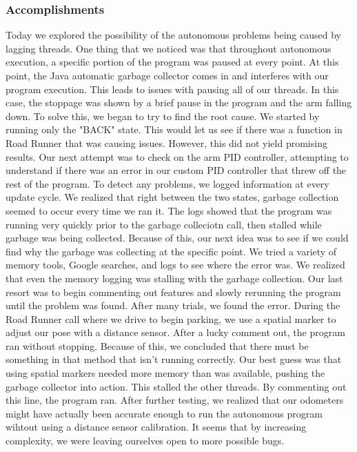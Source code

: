 \subsubsection*{Accomplishments}
Today we explored the possibility of the autonomous problems being caused by lagging threads. One thing that we noticed was that throughout autonomous execution, a specific portion of the program was paused at every point. At this point, the Java automatic garbage collector comes in and interferes with our program execution. This leads to issues with pausing all of our threads. In this case, the stoppage was shown by a brief pause in the program and the arm falling down. 
To solve this, we began to try to find the root cause. We started by running only the "BACK" state. This would let us see if there was a function in Road Runner that was causing issues. However, this did not yield promising results. Our next attempt was to check on the arm PID controller, attempting to understand if there was an error in our custom PID controller that threw off the rest of the program. To detect any problems, we logged information at every update cycle. We realized that right between the two states, garbage collection seemed to occur every time we ran it. The logs showed that the program was running very quickly prior to the garbage colleciotn call, then stalled while garbage was being collected. Because of this, our next idea was to see if we could find why the garbage was collecting at the specific point. We tried a variety of memory tools, Google searches, and logs to see where the error was. We realized that even the memory logging was stalling with the garbage collection.
Our last resort was to begin commenting out features and slowly rerunning the program until the problem was found. After many trials, we found the error. During the Road Runner call where we drive to begin parking, we use a spatial marker to adjust our pose with a distance sensor. After a lucky comment out, the program ran without stopping. Because of this, we concluded that there must be something in that method that isn't running correctly. Our best guess was that using spatial markers needed more memory than was available, pushing the garbage collector into action. This stalled the other threads. By commenting out this line, the program ran. After further testing, we realized that our odometers might have actually been accurate enough to run the autonomous program wihtout using a distance sensor calibration. It seems that by increasing complexity, we were leaving ourselves open to more possible bugs. 




